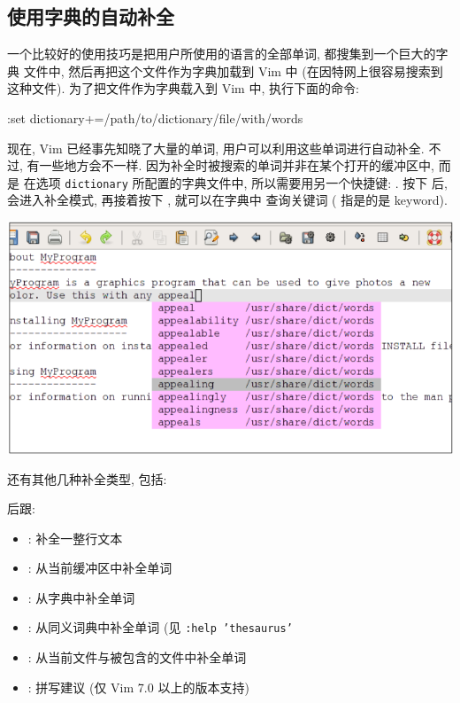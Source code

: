 \subsection{使用字典的自动补全}
\label{subsec:autocompletion_using_dictionary_lookup}

一个比较好的使用技巧是把用户所使用的语言的全部单词, 都搜集到一个巨大的字典
文件中, 然后再把这个文件作为字典加载到 Vim 中 (在因特网上很容易搜索到这种文件).
为了把文件作为字典载入到 Vim 中, 执行下面的命令:
\begin{vimcode}
:set dictionary+=/path/to/dictionary/file/with/words
\end{vimcode}
现在, Vim 已经事先知晓了大量的单词, 用户可以利用这些单词进行自动补全. 不过,
有一些地方会不一样. 因为补全时被搜索的单词并非在某个打开的缓冲区中, 而是 
在选项 \texttt{dictionary} 所配置的字典文件中, 所以需要用另一个快捷键:
.
按下  后, 会进入补全模式, 再接着按下 , 就可以在字典中
查询关键词 ( 指是的是 keyword).
\begin{center}
    \includegraphics[scale=0.6]{./images/page86.png}
\end{center}

还有其他几种补全类型, 包括:

 后跟:
\begin{itemize}
    \item {}: 补全一整行文本
    \item {}: 从当前缓冲区中补全单词
    \item {}: 从字典中补全单词
    \item {}: 从同义词典中补全单词 (见 \texttt{:help 'thesaurus'}
    \item {}: 从当前文件与被包含的文件中补全单词
    \item {}: 拼写建议 (仅 Vim 7.0 以上的版本支持)
\end{itemize}

